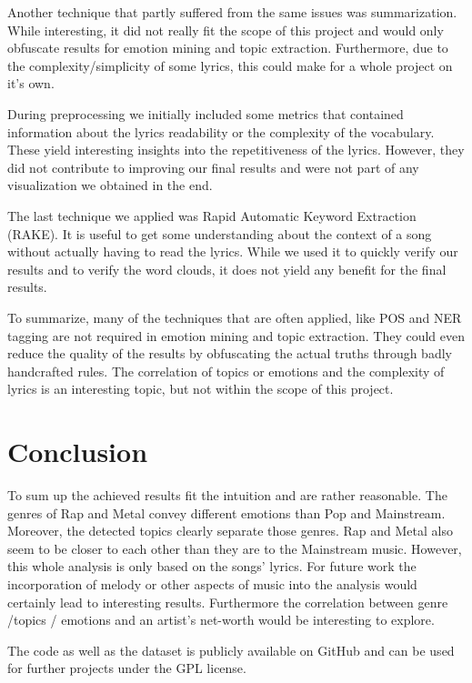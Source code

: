\documentclass[10pt,a4paper]{article}
\begin{document}
	Another technique that partly suffered from the same issues was summarization. While interesting, it did not really fit the scope of this project and would only obfuscate results for emotion mining and topic extraction. Furthermore, due to the complexity/simplicity of some lyrics, this could make for a whole project on it's own.
	
	During preprocessing we initially included some metrics that contained information about the lyrics readability or the complexity of the vocabulary. These yield interesting insights into the repetitiveness of the lyrics. However, they did not contribute to improving our final results and were not part of any visualization we obtained in the end.
	
	The last technique we applied was Rapid Automatic Keyword Extraction (RAKE). It is useful to get some understanding about the context of a song without actually having to read the lyrics. While we used it to quickly verify our results and to verify the word clouds, it does not yield any benefit for the final results.
	
	To summarize, many of the techniques that are often applied, like POS and NER tagging are not required in emotion mining and topic extraction. They could even reduce the quality of the results by obfuscating the actual truths through badly handcrafted rules. The correlation of topics or emotions and the complexity of lyrics is an interesting topic, but not within the scope of this project. 

	\section{Conclusion}
	\label{sec:conclusion}
	To sum up the achieved results fit the intuition and are rather reasonable. The genres of Rap and Metal convey different emotions than Pop and Mainstream. Moreover, the detected topics clearly separate those genres. Rap and Metal also seem to be closer to each other than they are to the Mainstream music. However, this whole analysis is only based on the songs' lyrics. For future work the incorporation of melody or other aspects of music into the analysis would certainly lead to interesting results. Furthermore the correlation between genre /topics /  emotions and an artist's net-worth would be interesting to explore.
	
	The code as well as the dataset is publicly available on GitHub \cite{code} and can be used for further projects under the GPL license.
	
	\newpage
	
	
	
	
\end{document}
